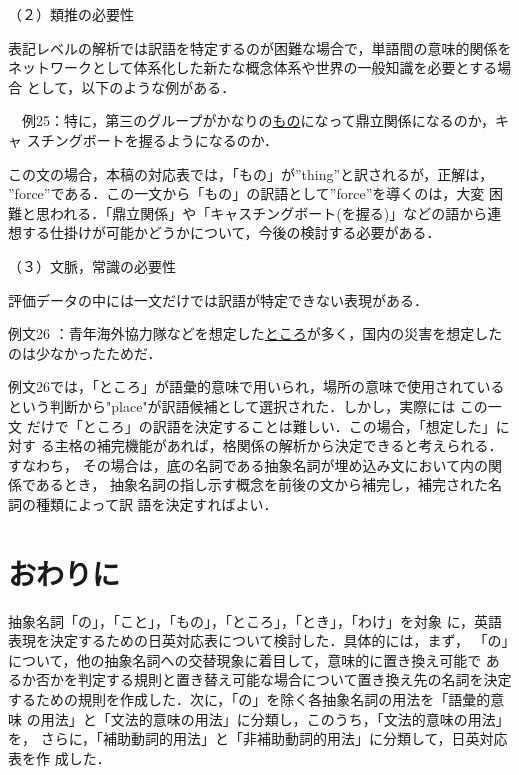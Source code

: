 \vspace{6pt}

（２）類推の必要性

表記レベルの解析では訳語を特定するのが困難な場合で，単語間の意味的関係を
ネットワークとして体系化した新たな概念体系や世界の一般知識を必要とする場合
として，以下のような例がある．

\vspace{6pt}

　例25：特に，第三のグループがかなりの\underline{もの}になって鼎立関係になるのか，キャ
スチングボートを握るようになるのか．

\vspace{6pt}

この文の場合，本稿の対応表では，「もの」が''thing''と訳されるが，正解は，
''force''である．この一文から「もの」の訳語として''force''を導くのは，大変
困難と思われる．「鼎立関係」や「キャスチングボート(を握る)」などの語から連
想する仕掛けが可能かどうかについて，今後の検討する必要がある．

\vspace{6pt}

（３）文脈，常識の必要性

評価データの中には一文だけでは訳語が特定できない表現がある．

\vspace{6pt}

例文26 ：青年海外協力隊などを想定した\underline{ところ}が多く，国内の災害を想定した
のは少なかったためだ．

\vspace{6pt}

例文26では，「ところ」が語彙的意味で用いられ，場所の意味で使用されている
という判断から"place"が訳語候補として選択された．しかし，実際には この一文
だけで「ところ」の訳語を決定することは難しい．この場合，「想定した」に対す
る主格の補完機能があれば，格関係の解析から決定できると考えられる．すなわち，
その場合は，底の名詞である抽象名詞が埋め込み文において内の関係であるとき，
抽象名詞の指し示す概念を前後の文から補完し，補完された名詞の種類によって訳
語を決定すればよい．

\vspace{1em}

\section{おわりに}

抽象名詞「の」，「こと」，「もの」，「ところ」，「とき」，「わけ」を対象
に，英語表現を決定するための日英対応表について検討した．具体的には，まず，
「の」について，他の抽象名詞への交替現象に着目して，意味的に置き換え可能で
あるか否かを判定する規則と置き替え可能な場合について置き換え先の名詞を決定
するための規則を作成した．次に，「の」を除く各抽象名詞の用法を「語彙的意味
の用法」と「文法的意味の用法」に分類し，このうち，「文法的意味の用法」を，
さらに，「補助動詞的用法」と「非補助動詞的用法」に分類して，日英対応表を作
成した．


